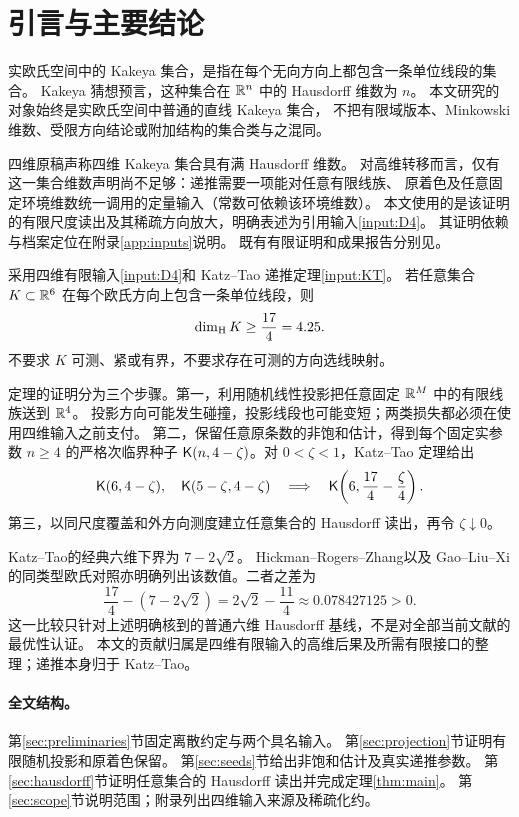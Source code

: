 \section{引言与主要结论}
\label{sec:introduction}

实欧氏空间中的 Kakeya 集合，是指在每个无向方向上都包含一条单位线段的集合。
Kakeya 猜想预言，这种集合在 $\mathbb R^n$ 中的 Hausdorff 维数为 $n$。
本文研究的对象始终是实欧氏空间中普通的直线 Kakeya 集合，
不把有限域版本、Minkowski 维数、受限方向结论或附加结构的集合类与之混同。

四维原稿\cite{OAI4}声称四维 Kakeya 集合具有满 Hausdorff 维数。
对高维转移而言，仅有这一集合维数声明尚不足够：递推需要一项能对任意有限线族、
原着色及任意固定环境维数统一调用的定量输入（常数可依赖该环境维数）。
本文使用的是该证明的有限尺度读出及其稀疏方向放大，明确表述为引用输入\ref{input:D4}。
其证明依赖与档案定位在附录\ref{app:inputs}说明。
既有有限证明和成果报告分别见\cite{ArchiveFSD,ArchiveDIM}。

\begin{theorem}[六维下界]\label{thm:main}
采用四维有限输入\ref{input:D4}和 Katz--Tao 递推定理\ref{input:KT}。
若任意集合 $K\subset\mathbb R^6$ 在每个欧氏方向上包含一条单位线段，则
\begin{equation}\label{eq:main}
  \operatorname{dim}_{\mathrm H} K\ge\frac{17}{4}=4.25.
\end{equation}
不要求 $K$ 可测、紧或有界，不要求存在可测的方向选线映射。
\end{theorem}

定理的证明分为三个步骤。第一，利用随机线性投影把任意固定 $\mathbb R^M$ 中的有限线族送到 $\mathbb R^4$。
投影方向可能发生碰撞，投影线段也可能变短；两类损失都必须在使用四维输入之前支付。
第二，保留任意原条数的非饱和估计，得到每个固定实参数 $n\ge4$ 的严格次临界种子
$\mathsf K(n,4-\zeta)$。对 $0<\zeta<1$，Katz--Tao 定理给出
\begin{equation}\label{eq:roadmap-recurrence}
  \mathsf K(6,4-\zeta),\quad\mathsf K(5-\zeta,4-\zeta)
  \quad\Longrightarrow\quad
  \mathsf K\!\left(6,\frac{17}{4}-\frac{\zeta}{4}\right).
\end{equation}
第三，以同尺度覆盖和外方向测度建立任意集合的 Hausdorff 读出，再令 $\zeta\downarrow0$。

Katz--Tao\cite{KT}的经典六维下界为 $7-2\sqrt2$。
Hickman--Rogers--Zhang\cite[Figure 5]{HRZ}以及 Gao--Liu--Xi\cite[Table 1]{GLX}
的同类型欧氏对照亦明确列出该数值。二者之差为
\begin{equation}\label{eq:comparison}
 \frac{17}{4}-(7-2\sqrt2)
   =2\sqrt2-\frac{11}{4}
   \approx0.078427125>0.
\end{equation}
这一比较只针对上述明确核到的普通六维 Hausdorff 基线，不是对全部当前文献的最优性认证。
本文的贡献归属是四维有限输入的高维后果及所需有限接口的整理；递推本身归于 Katz--Tao。

\paragraph{全文结构。}
第\ref{sec:preliminaries}节固定离散约定与两个具名输入。
第\ref{sec:projection}节证明有限随机投影和原着色保留。
第\ref{sec:seeds}节给出非饱和估计及真实递推参数。
第\ref{sec:hausdorff}节证明任意集合的 Hausdorff 读出并完成定理\ref{thm:main}。
第\ref{sec:scope}节说明范围；附录列出四维输入来源及稀疏化约。
